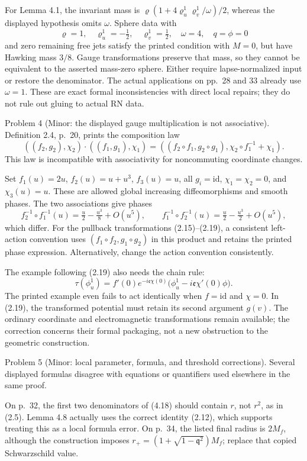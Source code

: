 \documentclass[10pt]{article}
\begin{document}
For Lemma 4.1, the invariant mass is \(\varrho(1+4\varrho_u^1\varrho_v^1/\omega)/2\), whereas the displayed hypothesis omits \(\omega\). Sphere data with \[\varrho=1,\quad \varrho_u^1=-\tfrac12,\quad
 \varrho_v^1=\tfrac12,\quad \omega=4,\quad q=\phi=0\] and zero remaining free jets satisfy the printed condition with \(M=0\), but have Hawking mass \(3/8\). Gauge transformations preserve that mass, so they cannot be equivalent to the asserted mass-zero sphere. Either require lapse-normalized input or restore the denominator. The actual applications on pp. 28 and 33 already use \(\omega=1\). These are exact formal inconsistencies with direct local repairs; they do not rule out gluing to actual RN data.\par
Problem 4 (Minor: the displayed gauge multiplication is not associative).  Definition 2.4, p. 20, prints the composition law \[((f_2,g_2),\chi_2)\cdot((f_1,g_1),\chi_1)
 =((f_2\circ f_1,g_2\circ g_1),\chi_2\circ f_1^{-1}+\chi_1).\] This law is incompatible with associativity for noncommuting coordinate changes.\par
Set \(f_1(u)=2u\), \(f_2(u)=u+u^3\), \(f_3(u)=u\), all \(g_i=\mathrm{id}\), \(\chi_1=\chi_2=0\), and \(\chi_3(u)=u\). These are allowed global increasing diffeomorphisms and smooth phases. The two associations give phases \[f_2^{-1}\circ f_1^{-1}(u)
    =\tfrac u2-\tfrac{u^3}{8}+O(u^5),\qquad
 f_1^{-1}\circ f_2^{-1}(u)
    =\tfrac u2-\tfrac{u^3}{2}+O(u^5),\] which differ. For the pullback transformations (2.15)–(2.19), a consistent left-action convention uses \((f_1\circ f_2,g_1\circ g_2)\) in this product and retains the printed phase expression. Alternatively, change the action convention consistently.\par
The example following (2.19) also needs the chain rule: \[\tau(\phi_u^1)
 =f'(0)e^{-i\mathfrak e\chi(0)}
      \bigl(\phi_u^1-i\mathfrak e\chi'(0)\phi\bigr).\] The printed example even fails to act identically when \(f=\mathrm{id}\) and \(\chi=0\). In (2.19), the transformed potential must retain its second argument \(g(v)\). The ordinary coordinate and electromagnetic transformations remain available; the correction concerns their formal packaging, not a new obstruction to the geometric construction.\par
Problem 5 (Minor: local parameter, formula, and threshold corrections).  Several displayed formulas disagree with equations or quantifiers used elsewhere in the same proof.\par
On p. 32, the first two denominators of (4.18) should contain \(r\), not \(r^2\), as in (2.5). Lemma 4.8 actually uses the correct identity (2.12), which supports treating this as a local formula error. On p. 34, the listed final radius is \(2M_f\), although the construction imposes \(r_+=(1+\sqrt{1-\mathfrak q^2})M_f\); replace that copied Schwarzschild value.\par
\end{document}
